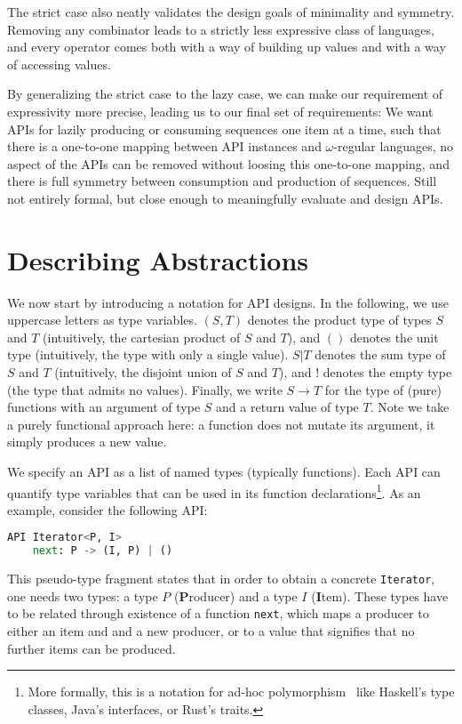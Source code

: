 \documentclass[sigplan,screen,10pt,review]{acmart}
\begin{document}
The strict case also neatly validates the design goals of minimality and symmetry. Removing any combinator leads to a strictly less expressive class of languages, and every operator comes both with a way of building up values and with a way of accessing values.

By generalizing the strict case to the lazy case, we can make our requirement of expressivity more precise, leading us to our final set of requirements: We want APIs for lazily producing or consuming sequences one item at a time, such that there is a one-to-one mapping between API instances and $\omega$-regular languages, no aspect of the APIs can be removed without loosing this one-to-one mapping, and there is full symmetry between consumption and production of sequences. Still not entirely formal, but close enough to meaningfully evaluate and design APIs.


\section{Describing Abstractions}\label{evaluating_others}

We now start by introducing a notation for API designs. In the following, we use uppercase letters as type variables. $(S, T)$ denotes the product type of types $S$ and $T$ (intuitively, the cartesian product of $S$ and $T$), and $()$ denotes the unit type (intuitively, the type with only a single value). $S | T$ denotes the sum type of $S$ and $T$ (intuitively, the disjoint union of $S$ and $T$), and $!$ denotes the empty type (the type that admits no values). Finally, we write $S \rightarrow T$ for the type of (pure) functions with an argument of type $S$ and a return value of type $T$. Note we take a purely functional approach here: a function does not mutate its argument, it simply produces a new value.

We specify an API as a list of named types (typically functions). Each API can quantify type variables that can be used in its function declarations\footnote{More formally, this is a notation for ad-hoc polymorphism~\cite{wadler1989make} like Haskell's type classes, Java's interfaces, or Rust's traits.}. As an example, consider the following API:

\begin{lstlisting}[language=Python]
API Iterator<P, I>
    next: P -> (I, P) | ()
\end{lstlisting}

This pseudo-type fragment states that in order to obtain a concrete \texttt{Iterator}, one needs two types: a type $P$ (\textbf{P}roducer) and a type $I$ (\textbf{I}tem). These types have to be related through existence of a function \texttt{next}, which maps a producer to either an item and and a new producer, or to a value that signifies that no further items can be produced.
\end{document}
